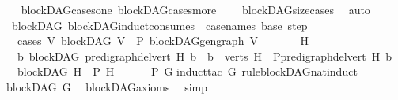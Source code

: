 \begin{isabellebody}
%
\isadelimproof
\ \ %
\endisadelimproof
%
\isatagproof
{}\isamarkupfalse%
\ blockDAG{\isacharunderscore}{\kern0pt}cases{\isacharunderscore}{\kern0pt}one\ blockDAG{\isacharunderscore}{\kern0pt}cases{\isacharunderscore}{\kern0pt}more\isanewline
\ \ \ \ blockDAG{\isacharunderscore}{\kern0pt}size{\isacharunderscore}{\kern0pt}cases\ \isamarkupfalse%
\ auto%
\endisatagproof
{\isafoldproof}%
%
\isadelimproof
\isanewline
%
\endisadelimproof
\isanewline
{}\isamarkupfalse%
\ {\isacharparenleft}{\kern0pt}\ blockDAG{\isacharparenright}{\kern0pt}\ blockDAG{\isacharunderscore}{\kern0pt}induct{\isacharbrackleft}{\kern0pt}consumes\ {}{\isacharcomma}{\kern0pt}\ case{\isacharunderscore}{\kern0pt}names\ base\ step{\isacharbrackright}{\kern0pt}{\isacharcolon}{\kern0pt}\isanewline
\ \ \ cases{\isacharcolon}{\kern0pt}\ {\isachardoublequoteopen}{\isasymAnd}V{\isachardot}{\kern0pt}\ blockDAG\ V\ {\isasymLongrightarrow}\ P\ {\isacharparenleft}{\kern0pt}blockDAG{\isachardot}{\kern0pt}gen{\isacharunderscore}{\kern0pt}graph\ V{\isacharparenright}{\kern0pt}{\isachardoublequoteclose}\isanewline
\ \ \ \ \ \ \ {\isachardoublequoteopen}{\isasymAnd}H{\isachardot}{\kern0pt}\ \isanewline
\ \ \ {\isacharparenleft}{\kern0pt}{\isasymAnd}b{\isachardot}{\kern0pt}\ blockDAG\ {\isacharparenleft}{\kern0pt}pre{\isacharunderscore}{\kern0pt}digraph{\isachardot}{\kern0pt}del{\isacharunderscore}{\kern0pt}vert\ H\ b{\isacharparenright}{\kern0pt}\ {\isasymLongrightarrow}\ b\ {\isasymin}\ verts\ H\ {\isasymLongrightarrow}\ P{\isacharparenleft}{\kern0pt}pre{\isacharunderscore}{\kern0pt}digraph{\isachardot}{\kern0pt}del{\isacharunderscore}{\kern0pt}vert\ H\ b{\isacharparenright}{\kern0pt}{\isacharparenright}{\kern0pt}\isanewline
\ \ {\isasymLongrightarrow}\ {\isacharparenleft}{\kern0pt}blockDAG\ H\ {\isasymLongrightarrow}\ P\ H{\isacharparenright}{\kern0pt}{\isachardoublequoteclose}\isanewline
\ \ \ \ \ \ {\isachardoublequoteopen}P\ G{\isachardoublequoteclose}\isanewline
%
\isadelimproof
%
\endisadelimproof
%
\isatagproof
{}\isamarkupfalse%
{\isacharparenleft}{\kern0pt}induct{\isacharunderscore}{\kern0pt}tac\ G\ rule{\isacharcolon}{\kern0pt}blockDAG{\isacharunderscore}{\kern0pt}nat{\isacharunderscore}{\kern0pt}induct{\isacharparenright}{\kern0pt}\ \isanewline
\ \ \isamarkupfalse%
\ {\isachardoublequoteopen}blockDAG\ G{\isachardoublequoteclose}\ \isamarkupfalse%
\ blockDAG{\isacharunderscore}{\kern0pt}axioms\ \isamarkupfalse%
\ simp\isanewline

\end{isabellebody}
